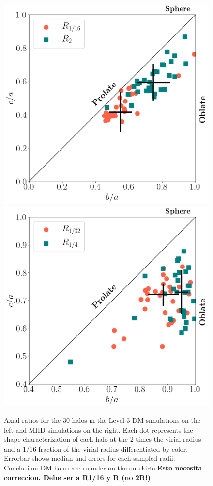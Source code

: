 \documentclass[a4paper,fleqn,usenatbib]{mnras}
\begin{document}
 
\begin{figure}
\begin{center}
\includegraphics[width=0.9\columnwidth]{./pics/Triaxial_Plane/Triax_DM.png}
 \includegraphics[width=0.9\columnwidth]{./pics/Triaxial_Plane/Triax_MHD.png}
\end{center}
\caption{Axial ratios for the 30 halos in the Level 3 DM simulations
  on the left and MHD simulations on the right.
   Each dot represents the shape characterization of each halo at the
   2 times the virial radius and a  1/16 fraction of the virial radius
   differentiated by color. 
   Errorbar shows median and errors for each sampled radii. 
   Conclusion: DM halos are rounder on the outskirts {\bf Esto necesita
  correccion. Debe ser a R1/16 y R (no 2R!)}}
  \label{fig:triax_DM_MHD}
\end{figure}
\end{document}
